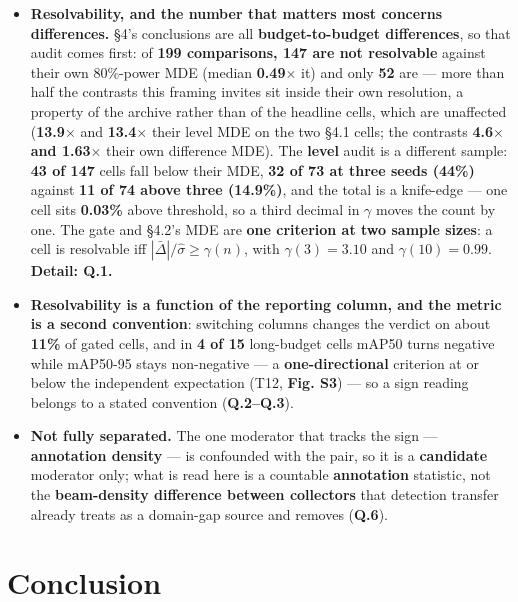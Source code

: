 \documentclass[pdflatex,sn-mathphys-ay]{sn-jnl}
\begin{document}
\begin{itemize}
\item \textbf{Resolvability, and the number that matters most concerns differences.} \S{}4's conclusions are all \textbf{budget-to-budget differences}, so that audit comes first: of \textbf{199 comparisons, 147 are not resolvable} against their own 80\%-power MDE (median \textbf{0.49\ensuremath{\times}} it) and only \textbf{52} are --- more than half the contrasts this framing invites sit inside their own resolution, a property of the archive rather than of the headline cells, which are unaffected (\textbf{13.9\ensuremath{\times}} and \textbf{13.4\ensuremath{\times}} their level MDE on the two \S{}4.1 cells; the contrasts \textbf{4.6\ensuremath{\times} and 1.63\ensuremath{\times}} their own difference MDE). The \textbf{level} audit is a different sample: \textbf{43 of 147} cells fall below their MDE, \textbf{32 of 73 at three seeds (44\%)} against \textbf{11 of 74 above three (14.9\%)}, and the total is a knife-edge --- one cell sits \textbf{0.03\%} above threshold, so a third decimal in \ensuremath{\gamma} moves the count by one. The gate and \S{}4.2's MDE are \textbf{one criterion at two sample sizes}: a cell is resolvable iff $|\bar\Delta|/\hat\sigma \ge \gamma(n)$, with $\gamma(3) = 3.10$ and $\gamma(10) = 0.99$. \textbf{Detail: Q.1.}
\item \textbf{Resolvability is a function of the reporting column, and the metric is a second convention}: switching columns changes the verdict on about \textbf{11\%} of gated cells, and in \textbf{4 of 15} long-budget cells mAP50 turns negative while mAP50-95 stays non-negative --- a \textbf{one-directional} criterion at or below the independent expectation (T12, \textbf{Fig. S3}) --- so a sign reading belongs to a stated convention (\textbf{Q.2--Q.3}).
\item \textbf{Not fully separated.} The one moderator that tracks the sign --- \textbf{annotation density} --- is confounded with the pair, so it is a \textbf{candidate} moderator only; what is read here is a countable \textbf{annotation} statistic, not the \textbf{beam-density difference between collectors} that detection transfer already treats as a domain-gap source and removes \textbf{\citep{hu2023}} (\textbf{Q.6}).
\end{itemize}

\section{Conclusion}%
\end{document}
